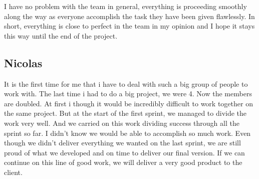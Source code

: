 I have no problem with the team in general, everything is proceeding
smoothly along the way as everyone accomplish the task they have been given
flawlessly. In short, everything is close to perfect in the team in my
opinion and I hope it stays this way until the end of the project.
\subsection{Nicolas}
It is the first time for me that i have to deal with such a big group of people to work with. The last time i had to do a big project, we were 4. Now the members are doubled. At first i though it would be incredibly difficult to work together on the same project. But at the start of the first sprint, we managed to divide the work very well. And we carried on this work dividing success through all the sprint so far. I didn't know we would be able to accomplish so much work. Even though we didn't deliver everything we wanted on the last sprint, we are still proud of what we developed and on time to deliver our final version. If we can continue on this line of good work, we will deliver a very good product to the client.
